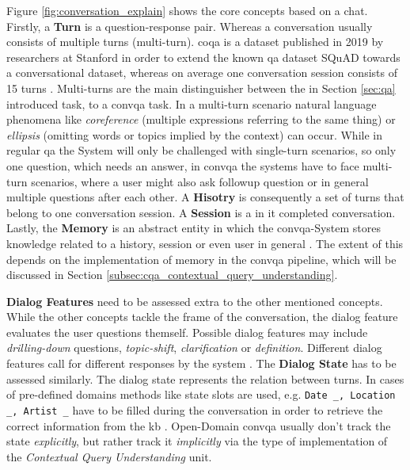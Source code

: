 Figure \ref{fig:conversation_explain} shows the core concepts based on a chat. Firstly, a \textbf{Turn} is a question-response pair. Whereas a conversation usually consists of multiple turns (multi-turn). \gls{coqa} is a dataset published in 2019 by researchers at Stanford in order to extend the known \gls{qa} dataset SQuAD towards a conversational dataset, whereas on average one conversation session consists of 15 turns \cite{reddy_coqa_2018}. Multi-turns are the main distinguisher between the in Section \ref{sec:qa} introduced task, to a \gls{convqa} task. In a multi-turn scenario natural language phenomena like \textit{coreference} (multiple expressions referring to the same thing) or \textit{ellipsis} (omitting words or topics implied by the context) can occur. While in regular \gls{qa} the System will only be challenged with single-turn scenarios, so only one question, which needs an answer, in \gls{convqa} the systems have to face multi-turn scenarios, where a user might also ask followup question or in general multiple questions after each other. A \textbf{Hisotry} is consequently a set of turns that belong to one conversation session. A \textbf{Session} is a in it completed conversation. Lastly, the \textbf{Memory} is an abstract entity in which the \gls{convqa}-System stores knowledge related to a history, session or even user in general \cite{zamani_conversational_2023,gao_neural_2022}. The extent of this depends on the implementation of memory in the \gls{convqa} pipeline, which will be discussed in Section \ref{subsec:cqa_contextual_query_understanding}.

\textbf{Dialog Features} need to be assessed extra to the other mentioned concepts. While the other concepts tackle the frame of the conversation, the dialog feature evaluates the user questions themself. Possible dialog features may include \textit{drilling-down} questions, \textit{topic-shift}, \textit{clarification} or \textit{definition}. Different dialog features call for different responses by the system \cite{gupta_conversational_2020}. The \textbf{Dialog State} has to be assessed similarly. The dialog state represents the relation between turns. In cases of pre-defined domains methods like state slots are used, e.g. \verb |Date _, Location _, Artist _| have to be filled during the conversation in order to retrieve the correct information from the \gls{kb} \cite{rastogi_schema-guided_2020}. Open-Domain \gls{convqa} usually don't track the state \textit{explicitly}, but rather track it \textit{implicitly} via the type of implementation of the \textit{Contextual Query Understanding} unit.


